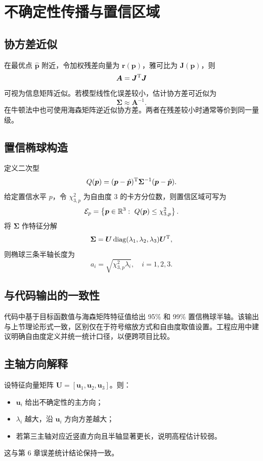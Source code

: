 \chapter{不确定性传播与置信区域}

\section{协方差近似}
在最优点 $\hat{\bm p}$ 附近，令加权残差向量为 $\bm r(\bm p)$，雅可比为 $\bm J(\bm p)$，则
\[
\bm A=\bm J^{\mathrm{T}}\bm J
\]
可视为信息矩阵近似。若模型线性化误差较小，估计协方差可近似为
\begin{equation}
\bm\Sigma\approx \bm A^{-1}.
\label{eq:cov_approx}
\end{equation}
在牛顿法中也可使用海森矩阵逆近似协方差。两者在残差较小时通常等价到同一量级。

\section{置信椭球构造}
定义二次型
\[
Q(\bm p)=
(\bm p-\hat{\bm p})^{\mathrm{T}}\bm\Sigma^{-1}(\bm p-\hat{\bm p}).
\]
给定置信水平 $p$，令 $\chi^2_{3,p}$ 为自由度 3 的卡方分位数，则置信区域可写为
\begin{equation}
\mathcal E_p=
\left\{\bm p\in\mathbb{R}^3:\ Q(\bm p)\le \chi^2_{3,p}\right\}.
\end{equation}
将 $\bm\Sigma$ 作特征分解
\[
\bm\Sigma=\bm U\operatorname{diag}(\lambda_1,\lambda_2,\lambda_3)\bm U^{\mathrm{T}},
\]
则椭球三条半轴长度为
\[
a_i=\sqrt{\chi^2_{3,p}\lambda_i},\quad i=1,2,3.
\]

\section{与代码输出的一致性}
代码中基于目标函数值与海森矩阵特征值给出 95\% 和 99\% 置信椭球半轴。该输出与上节理论形式一致，区别仅在于符号缩放方式和自由度取值设置。工程应用中建议明确自由度定义并统一统计口径，以便跨项目比较。

\section{主轴方向解释}
设特征向量矩阵 $\bm U=[\bm u_1,\bm u_2,\bm u_3]$。则：
\begin{itemize}
  \item $\bm u_i$ 给出不确定性的主方向；
  \item $\lambda_i$ 越大，沿 $\bm u_i$ 方向方差越大；
  \item 若第三主轴对应近竖直方向且半轴显著更长，说明高程估计较弱。
\end{itemize}
这与第 6 章误差统计结论保持一致。

